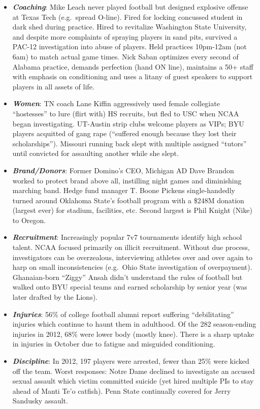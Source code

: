 \documentclass[
]{article}
\begin{document}
\begin{itemize}
\item
  \textbf{\emph{Coaching}}: Mike Leach never played football but
  designed explosive offense at Texas Tech (e.g.~spread O-line). Fired
  for locking concussed student in dark shed during practice. Hired to
  revitalize Washington State University, and despite more complaints of
  spraying players in sand pits, survived a PAC-12 investigation into
  abuse of players. Held practices 10pm-12am (not 6am) to match actual
  game times. Nick Saban optimizes every second of Alabama practice,
  demands perfection (hand ON line), maintains a 50+ staff with emphasis
  on conditioning and uses a litany of guest speakers to support players
  in all assets of life.
\item
  \textbf{\emph{Women}}: TN coach Lane Kiffin aggressively used female
  collegiate ``hostesses'' to lure (flirt with) HS recruits, but fled to
  USC when NCAA began investigating. UT-Austin strip clubs welcome
  players as VIPs; BYU players acquitted of gang rape (``suffered enough
  because they lost their scholarships''). Missouri running back slept
  with multiple assigned ``tutors'' until convicted for assaulting
  another while she slept.
\item
  \textbf{\emph{Brand/Donors}}: Former Domino's CEO, Michigan AD Dave
  Brandon worked to protect brand above all, instilling night games and
  diminishing marching band. Hedge fund manager T. Boone Pickens
  single-handedly turned around Oklahoma State's football program with a
  \$248M donation (largest ever) for stadium, facilities, etc. Second
  largest is Phil Knight (Nike) to Oregon.
\item
  \textbf{\emph{Recruitment}}: Increasingly popular 7v7 tournaments
  identify high school talent. NCAA focused primarily on illicit
  recruitment. Without due process, investigators can be overzealous,
  interviewing athletes over and over again to harp on small
  inconsistencies (e.g.~Ohio State investigation of overpayment).
  Ghanaian-born ``Ziggy'' Ansah didn't understand the rules of football
  but walked onto BYU special teams and earned scholarship by senior
  year (was later drafted by the Lions).
\item
  \textbf{\emph{Injuries}}: 56\% of college football alumni report
  suffering ``debilitating'' injuries which continue to haunt them in
  adulthood. Of the 282 season-ending injuries in 2012, 68\% were lower
  body (mostly knee). There is a sharp uptake in injuries in October due
  to fatigue and misguided conditioning.
\item
  \textbf{\emph{Discipline}}: In 2012, 197 players were arrested, fewer
  than 25\% were kicked off the team. Worst responses: Notre Dame
  declined to investigate an accused sexual assault which victim
  committed suicide (yet hired multiple PIs to stay ahead of Manti Te'o
  catfish). Penn State continually covered for Jerry Sandusky assault.
\end{itemize}
\end{document}
